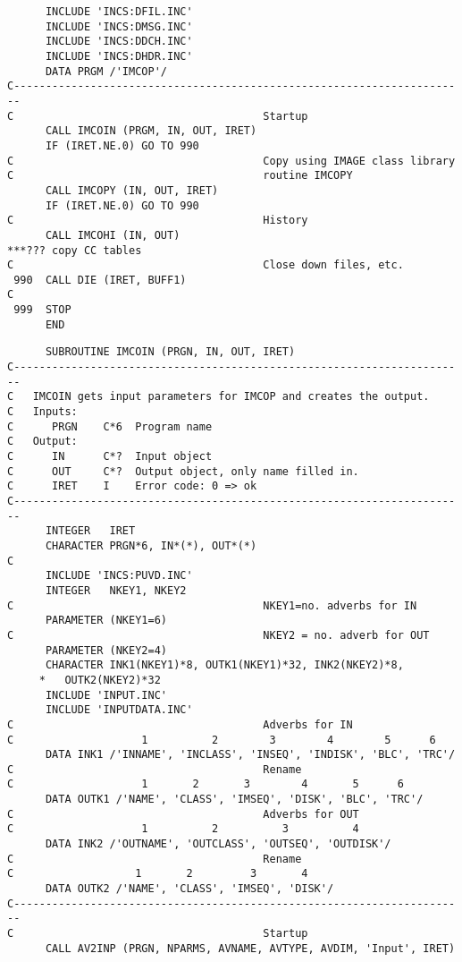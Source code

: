 {\begin{verbatim}
      INCLUDE 'INCS:DFIL.INC'
      INCLUDE 'INCS:DMSG.INC'
      INCLUDE 'INCS:DDCH.INC'
      INCLUDE 'INCS:DHDR.INC'
      DATA PRGM /'IMCOP'/
C-----------------------------------------------------------------------
C                                       Startup
      CALL IMCOIN (PRGM, IN, OUT, IRET)
      IF (IRET.NE.0) GO TO 990
C                                       Copy using IMAGE class library
C                                       routine IMCOPY
      CALL IMCOPY (IN, OUT, IRET)
      IF (IRET.NE.0) GO TO 990
C                                       History
      CALL IMCOHI (IN, OUT)
***??? copy CC tables
C                                       Close down files, etc.
 990  CALL DIE (IRET, BUFF1)
C
 999  STOP
      END
\end{verbatim}
\begin{verbatim}
      SUBROUTINE IMCOIN (PRGN, IN, OUT, IRET)
C-----------------------------------------------------------------------
C   IMCOIN gets input parameters for IMCOP and creates the output.
C   Inputs:
C      PRGN    C*6  Program name
C   Output:
C      IN      C*?  Input object
C      OUT     C*?  Output object, only name filled in.
C      IRET    I    Error code: 0 => ok
C-----------------------------------------------------------------------
      INTEGER   IRET
      CHARACTER PRGN*6, IN*(*), OUT*(*)
C
      INCLUDE 'INCS:PUVD.INC'
      INTEGER   NKEY1, NKEY2
C                                       NKEY1=no. adverbs for IN
      PARAMETER (NKEY1=6)
C                                       NKEY2 = no. adverb for OUT
      PARAMETER (NKEY2=4)
      CHARACTER INK1(NKEY1)*8, OUTK1(NKEY1)*32, INK2(NKEY2)*8,
     *   OUTK2(NKEY2)*32
      INCLUDE 'INPUT.INC'
      INCLUDE 'INPUTDATA.INC'
C                                       Adverbs for IN
C                    1          2        3        4        5      6
      DATA INK1 /'INNAME', 'INCLASS', 'INSEQ', 'INDISK', 'BLC', 'TRC'/
C                                       Rename
C                    1       2       3        4       5      6
      DATA OUTK1 /'NAME', 'CLASS', 'IMSEQ', 'DISK', 'BLC', 'TRC'/
C                                       Adverbs for OUT
C                    1          2          3          4
      DATA INK2 /'OUTNAME', 'OUTCLASS', 'OUTSEQ', 'OUTDISK'/
C                                       Rename
C                   1       2         3       4
      DATA OUTK2 /'NAME', 'CLASS', 'IMSEQ', 'DISK'/
C-----------------------------------------------------------------------
C                                       Startup
      CALL AV2INP (PRGN, NPARMS, AVNAME, AVTYPE, AVDIM, 'Input', IRET)

\end{verbatim}}
